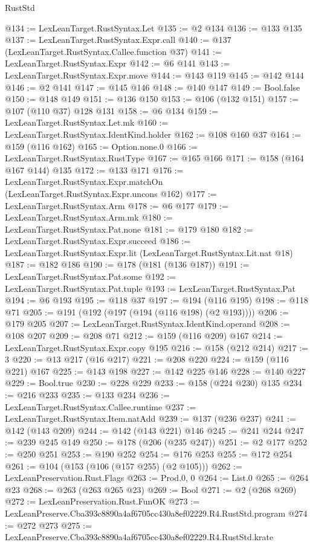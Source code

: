 \begin{lexlean}{RustStd}
\begin{coremodule}
@134 := LexLeanTarget.RustSyntax.Let
@135 := @2 @134
@136 := @133 @135
@137 := LexLeanTarget.RustSyntax.Expr.call
@140 := @137 (LexLeanTarget.RustSyntax.Callee.function @37)
@141 := LexLeanTarget.RustSyntax.Expr
@142 := @6 @141
@143 := LexLeanTarget.RustSyntax.Expr.move
@144 := @143 @119
@145 := @142 @144
@146 := @2 @141
@147 := @145 @146
@148 := @140 @147
@149 := Bool.false
@150 := @148 @149
@151 := @136 @150
@153 := @106 (@132 @151)
@157 := @107 (@110 @37) @128 @131
@158 := @6 @134
@159 := LexLeanTarget.RustSyntax.Let.mk
@160 := LexLeanTarget.RustSyntax.IdentKind.holder
@162 := @108 @160 @37
@164 := @159 (@116 @162)
@165 := Option.none.{0}
@166 := LexLeanTarget.RustSyntax.RustType
@167 := @165 @166
@171 := @158 (@164 @167 @144) @135
@172 := @133 @171
@176 := LexLeanTarget.RustSyntax.Expr.matchOn (LexLeanTarget.RustSyntax.Expr.uncons @162)
@177 := LexLeanTarget.RustSyntax.Arm
@178 := @6 @177
@179 := LexLeanTarget.RustSyntax.Arm.mk
@180 := LexLeanTarget.RustSyntax.Pat.none
@181 := @179 @180
@182 := LexLeanTarget.RustSyntax.Expr.succeed
@186 := LexLeanTarget.RustSyntax.Expr.lit (LexLeanTarget.RustSyntax.Lit.nat @18)
@187 := @182 @186
@190 := @178 (@181 (@136 @187))
@191 := LexLeanTarget.RustSyntax.Pat.some
@192 := LexLeanTarget.RustSyntax.Pat.tuple
@193 := LexLeanTarget.RustSyntax.Pat
@194 := @6 @193
@195 := @118 @37
@197 := @194 (@116 @195)
@198 := @118 @71
@205 := @191 (@192 (@197 (@194 (@116 @198) (@2 @193))))
@206 := @179 @205
@207 := LexLeanTarget.RustSyntax.IdentKind.operand
@208 := @108 @207
@209 := @208 @71
@212 := @159 (@116 @209) @167
@214 := LexLeanTarget.RustSyntax.Expr.copy @195
@216 := @158 (@212 @214)
@217 := 3
@220 := @13 @217 (@16 @217)
@221 := @208 @220
@224 := @159 (@116 @221) @167
@225 := @143 @198
@227 := @142 @225 @146
@228 := @140 @227
@229 := Bool.true
@230 := @228 @229
@233 := @158 (@224 @230) @135
@234 := @216 @233
@235 := @133 @234
@236 := LexLeanTarget.RustSyntax.Callee.runtime
@237 := LexLeanTarget.RustSyntax.Item.natAdd
@239 := @137 (@236 @237)
@241 := @142 (@143 @209)
@244 := @142 (@143 @221) @146
@245 := @241 @244
@247 := @239 @245 @149
@250 := @178 (@206 (@235 @247))
@251 := @2 @177
@252 := @250 @251
@253 := @190 @252
@254 := @176 @253
@255 := @172 @254
@261 := @104 (@153 (@106 (@157 @255) (@2 @105)))
@262 := LexLeanPreservation.Rust.Flags
@263 := Prod.{0, 0}
@264 := List.{0}
@265 := @264 @23
@268 := @263 (@263 @265 @23)
@269 := Bool
@271 := @2 (@268 @269)
@272 := LexLeanPreservation.Rust.FunOK
@273 := LexLeanPreserve.Cba393c8890a4af6705cc430a8ef02229.R4.RustStd.program
@274 := @272 @273
@275 := LexLeanPreserve.Cba393c8890a4af6705cc430a8ef02229.R4.RustStd.krate

\end{coremodule}
\end{lexlean}
